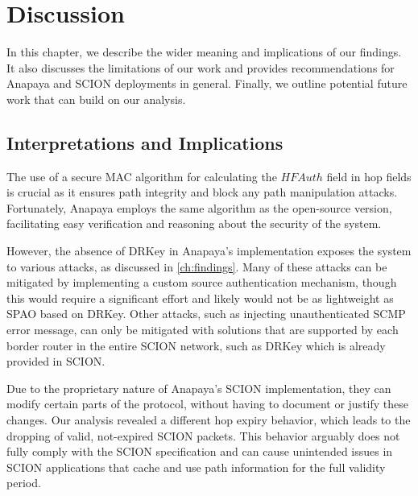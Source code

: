 \chapter{Discussion}
\label{ch:discussion}



In this chapter, we describe the wider meaning and implications of our findings.
It also discusses the limitations of our work and provides recommendations for Anapaya and SCION deployments in general.
Finally, we outline potential future work that can build on our analysis.


\section{Interpretations and Implications}
The use of a secure MAC algorithm for calculating the $HFAuth$ field in hop fields is crucial as it ensures path integrity and block any path manipulation attacks.
Fortunately, Anapaya employs the same algorithm as the open-source version, facilitating easy verification and reasoning about the security of the system.

However, the absence of DRKey in Anapaya's implementation exposes the system to various attacks, as discussed in \cref{ch:findings}.
Many of these attacks can be mitigated by implementing a custom source authentication mechanism, though this would require a significant effort and likely would not be as lightweight as SPAO based on DRKey.
Other attacks, such as injecting unauthenticated SCMP error message, can only be mitigated with solutions that are supported by each border router in the entire SCION network, such as DRKey which is already provided in SCION.

Due to the proprietary nature of Anapaya's SCION implementation, they can modify certain parts of the protocol, without having to document or justify these changes.
Our analysis revealed a different hop expiry behavior, which leads to the dropping of valid, not-expired SCION packets.
This behavior arguably does not fully comply with the SCION specification and can cause unintended issues in SCION applications that cache and use path information for the full validity period.


